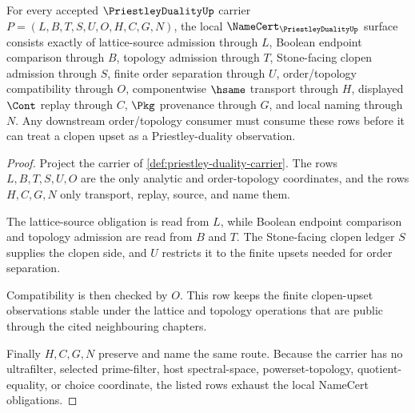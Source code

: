 \begin{theorem}
\label{thm:priestley-duality-namecert-obligations}
For every accepted $\PriestleyDualityUp$ carrier $P=(L,B,T,S,U,O,H,C,G,N)$, the local $\NameCert_{\PriestleyDualityUp}$ surface consists exactly of lattice-source admission through $L$, Boolean endpoint comparison through $B$, topology admission through $T$, Stone-facing clopen admission through $S$, finite order separation through $U$, order/topology compatibility through $O$, componentwise $\hsame$ transport through $H$, displayed $\Cont$ replay through $C$, $\Pkg$ provenance through $G$, and local naming through $N$. Any downstream order/topology consumer must consume these rows before it can treat a clopen upset as a Priestley-duality observation.
\end{theorem}
\begin{proof}
Project the carrier of \autoref{def:priestley-duality-carrier}. The rows $L,B,T,S,U,O$ are the only analytic and order-topology coordinates, and the rows $H,C,G,N$ only transport, replay, source, and name them.

The lattice-source obligation is read from $L$, while Boolean endpoint comparison and topology admission are read from $B$ and $T$. The Stone-facing clopen ledger $S$ supplies the clopen side, and $U$ restricts it to the finite upsets needed for order separation.

Compatibility is then checked by $O$. This row keeps the finite clopen-upset observations stable under the lattice and topology operations that are public through the cited neighbouring chapters.

Finally $H,C,G,N$ preserve and name the same route. Because the carrier has no ultrafilter, selected prime-filter, host spectral-space, powerset-topology, quotient-equality, or choice coordinate, the listed rows exhaust the local NameCert obligations.
\end{proof}


\begin{closurestatus}{\PriestleyDualityUp}
  \theoryclosure{\seedClosure}
  \formalstatus{\unformalizedV}
\end{closurestatus}
